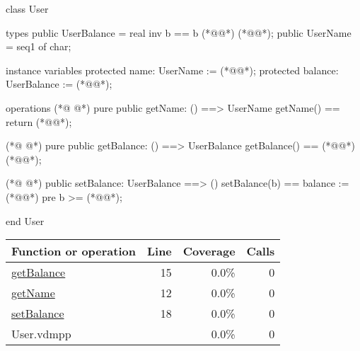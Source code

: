 \begin{vdmpp}[breaklines=true]
class User

types
 public UserBalance = real inv b == b (*@\vdmnotcovered{>=}@*) (*@@*);
 public UserName = seq1 of char;
 
instance variables
 protected name: UserName := (*@@*);
 protected balance: UserBalance := (*@@*);
 
operations 
(*@
\label{getName:12}
@*)
 pure public getName: () ==> UserName
 getName() == return (*@@*);
 
(*@
\label{getBalance:15}
@*)
 pure public getBalance: () ==> UserBalance
 getBalance() == (*@@*) (*@@*);
 
(*@
\label{setBalance:18}
@*)
 public setBalance: UserBalance ==> ()
 setBalance(b) == balance := (*@@*)
 pre b >= (*@@*);

end User
\end{vdmpp}
\bigskip
\begin{longtable}{|l|r|r|r|}
\hline
Function or operation & Line & Coverage & Calls \\
\hline
\hline
\hyperref[getBalance:15]{getBalance} & 15&0.0\% & 0 \\
\hline
\hyperref[getName:12]{getName} & 12&0.0\% & 0 \\
\hline
\hyperref[setBalance:18]{setBalance} & 18&0.0\% & 0 \\
\hline
\hline
User.vdmpp & & 0.0\% & 0 \\
\hline
\end{longtable}


